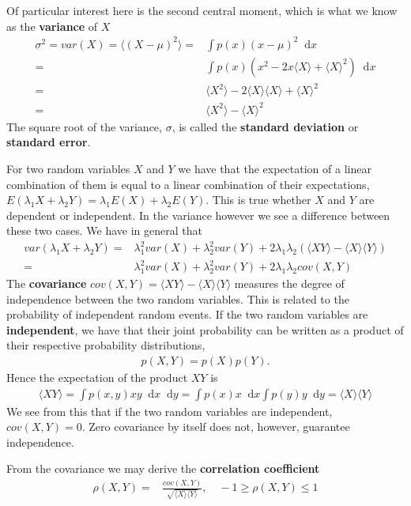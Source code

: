 \documentclass[twoside,english]{uiofysmaster}
\newcommand*\dif{\mathop{}\!\mathrm{d}}
\begin{document}
Of particular interest here is the second central moment, which is what we know as the \textbf{variance} of $X$
\begin{align}
	\sigma^2 = var(X) = \langle (X-\mu)^2 \rangle =& \int p(x) (x - \mu)^2 \dif x  \\
	=& \int p(x) (x^2 - 2x \langle X \rangle + \langle X \rangle^2) \dif x \\
	=& \langle X^2 \rangle - 2\langle X \rangle \langle X \rangle + \langle X \rangle^2  \\
	=& \langle X^2 \rangle - \langle X \rangle^2
\end{align}
The square root of the variance, $\sigma$, is called the \textbf{standard deviation} or \textbf{standard error}. 

For two random variables $X$ and $Y$ we have that the expectation of a linear combination of them is equal to a linear combination of their expectations, $E(\lambda_1 X + \lambda_2 Y) = \lambda_1 E(X) + \lambda_2 E(Y)$. This is true whether $X$ and $Y$ are dependent or independent. In the variance however we see a difference between these two cases. We have in general that
\begin{align}
	var(\lambda_1 X + \lambda_2 Y) =& \lambda_1^2 var(X) + \lambda_2^2 var(Y) + 2 \lambda_1 \lambda_2 ( \langle XY \rangle
	- \langle X \rangle \langle Y \rangle) \\
	=& \lambda_1^2 var(X) + \lambda_2^2 var(Y) + 2 \lambda_1 \lambda_2 cov (X, Y)
\end{align}
The \textbf{covariance} $cov(X, Y) = \langle XY \rangle	- \langle X \rangle \langle Y \rangle$ measures the degree of independence between the two random variables. This is related to the probability of independent random events. If the two random variables are \textbf{independent}, we have that their joint probability can be written as a product of their respective probability distributions,
\begin{align}
	p(X, Y) = p(X) p(Y) .
\end{align}
Hence the expectation of the product $XY$ is
\begin{align}
	\langle XY \rangle = \int p(x, y) xy \dif x \dif y = \int p(x) x \dif x \int p(y) y \dif y
	=\langle X \rangle \langle Y \rangle
\end{align}
We see from this that if the two random variables are independent, $cov(X,Y) = 0$. Zero covariance by itself does not, however, guarantee independence.

From the covariance we may derive the \textbf{correlation coefficient}
\begin{align}
	\rho(X,Y) =& \frac{cov(X,Y)}{\sqrt{ \langle X \rangle \langle Y \rangle }}, \quad
	-1 \geq \rho(X,Y) \leq 1
\end{align}
\end{document}
